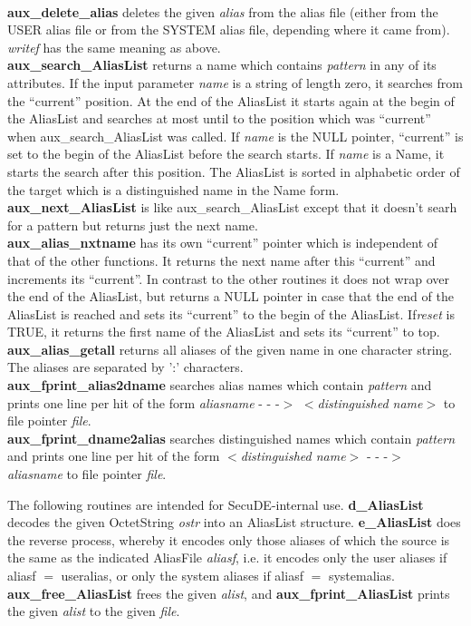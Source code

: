 \\ [1em]
{\bf aux\_delete\_alias} deletes the given {\em alias} from the alias file (either from
the USER alias file or from the SYSTEM alias file, depending where it came from).
{\em writef} has the same meaning as above.
\\ [1em]
{\bf aux\_search\_AliasList} returns a name which contains {\em pattern} in any of
its attributes. If the input parameter {\em name} is a string of length zero,
it searches from the ``current'' position. At the end of the AliasList it starts
again at the begin of the AliasList and searches at most until to the position
which was ``current'' when aux\_search\_AliasList was called. If {\em name} is the 
NULL pointer, ``current'' is set to the begin of the AliasList before the search starts.
If {\em name} is a Name, it starts the search after this position. The AliasList
is sorted in alphabetic order of the target which is a distinguished name in the Name form.
\\ [1em]
{\bf aux\_next\_AliasList} is like aux\_search\_AliasList except that it doesn't searh
for a pattern but returns just the next name. 
\\ [1em]
{\bf aux\_alias\_nxtname} has its own ``current'' pointer which is independent of that
of the other functions. It returns the next name after this ``current'' and increments
its ``current''. In contrast to the other routines it does not wrap over the end of
the AliasList, but returns a NULL pointer in case that the end of the AliasList
is reached and sets its ``current'' to the begin of the AliasList. If{\em reset} is TRUE,
it returns the first name of the AliasList and sets its ``current'' to top.
\\ [1em]
{\bf aux\_alias\_getall} returns all aliases of the given name in one character string.
The aliases are separated by ':' characters.
\\ [1em]
{\bf aux\_fprint\_alias2dname} searches alias names which contain {\em pattern} and
prints one line per hit of the form
\bc
{\em aliasname} - - -$>$ $<${\em distinguished name}$>$
\ec
to file pointer {\em file}.
\\ [1em]
{\bf aux\_fprint\_dname2alias} searches distinguished names which contain {\em pattern} and
prints one line per hit of the form
\bc
$<${\em distinguished name}$>$ - - -$>$  {\em aliasname}
\ec
to file pointer {\em file}.

The following routines are intended for SecuDE-internal use. {\bf d\_AliasList} decodes the
given OctetString {\em ostr} into an AliasList structure. {\bf e\_AliasList} does the reverse
process, whereby it encodes only those aliases of which the source is the same as the
indicated AliasFile {\em aliasf}, i.e. it encodes only the user aliases if aliasf $=$ useralias,
or only the system aliases if aliasf $=$ systemalias. {\bf aux\_free\_AliasList} frees
the given {\em alist}, and {\bf aux\_fprint\_AliasList} prints the given {\em alist}
to the given {\em file}.

